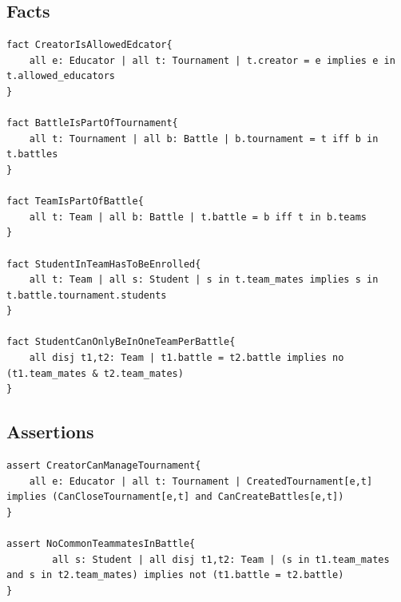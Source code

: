 \documentclass{article}
\begin{document}
\subsection{Facts}
\begin{lstlisting}
fact CreatorIsAllowedEdcator{
    all e: Educator | all t: Tournament | t.creator = e implies e in t.allowed_educators
}

fact BattleIsPartOfTournament{
    all t: Tournament | all b: Battle | b.tournament = t iff b in t.battles
}

fact TeamIsPartOfBattle{
    all t: Team | all b: Battle | t.battle = b iff t in b.teams
}

fact StudentInTeamHasToBeEnrolled{
    all t: Team | all s: Student | s in t.team_mates implies s in t.battle.tournament.students
}

fact StudentCanOnlyBeInOneTeamPerBattle{
	all disj t1,t2: Team | t1.battle = t2.battle implies no (t1.team_mates & t2.team_mates)
}
\end{lstlisting}

\subsection{Assertions}
\begin{lstlisting}
assert CreatorCanManageTournament{
    all e: Educator | all t: Tournament | CreatedTournament[e,t] implies (CanCloseTournament[e,t] and CanCreateBattles[e,t])
}

assert NoCommonTeammatesInBattle{
        all s: Student | all disj t1,t2: Team | (s in t1.team_mates and s in t2.team_mates) implies not (t1.battle = t2.battle)
}
\end{lstlisting}
\end{document}
